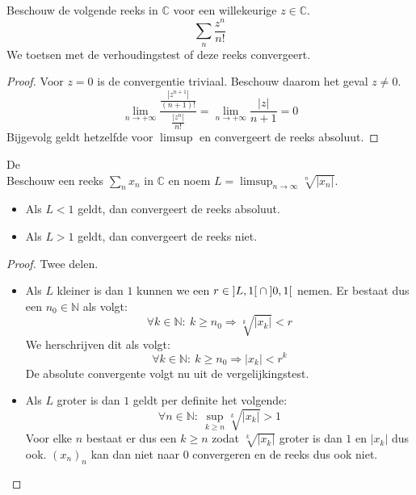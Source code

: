 \documentclass[main.tex]{subfiles}
\begin{document}
\begin{vb}
  Beschouw de volgende reeks in $\mathbb{C}$ voor een willekeurige $z\in \mathbb{C}$.
  \[ \sum_{n}\frac{z^{n}}{n!} \]
  We toetsen met de verhoudingstest of deze reeks convergeert.

  \begin{proof}
    Voor $z=0$ is de convergentie triviaal.
    Beschouw daarom het geval $z \neq 0$.
    \[ \lim_{n\rightarrow +\infty}\frac{\frac{|z^{n+1}|}{(n+1)!}}{\frac{|z^{n}|}{n!}} = \lim_{n \rightarrow +\infty }\frac{|z|}{n+1} = 0 \]
    Bijgevolg geldt hetzelfde voor $\limsup$  en convergeert de reeks absoluut.
  \end{proof}
\end{vb}

\begin{st}
  \label{st:worteltest-cauchy}
  De \\
  Beschouw een reeks $\sum_{n}x_{n}$ in $\mathbb{C}$ en noem $L= \limsup_{n\rightarrow \infty}\sqrt[n]{|x_{n}|}$.
  \begin{itemize}
  \item Als $L<1$ geldt, dan convergeert de reeks absoluut.
  \item Als $L>1$ geldt, dan convergeert de reeks niet.
  \end{itemize}

  \begin{proof}
    Twee delen.
    \begin{itemize}
    \item Als $L$ kleiner is dan $1$ kunnen we een $r\in \interval[open]{L}{1} \cap \interval[open]{0}{1}$ nemen.
      Er bestaat dus een $n_{0}\in \mathbb{N}$ als volgt:
      \[ \forall k\in \mathbb{N}:\ k \ge n_{0} \Rightarrow \sqrt[k]{|x_{k}|} < r \]
      We herschrijven dit als volgt:
      \[ \forall k\in \mathbb{N}:\ k \ge n_{0} \Rightarrow |x_{k}| < r^{k} \]
      De absolute convergente volgt nu uit de vergelijkingstest.
    \item Als $L$ groter is dan $1$ geldt per definite het volgende:
      \[ \forall n\in \mathbb{N}:\ \sup_{k\ge n}\sqrt[k]{|x_{k}|} > 1 \]
      Voor elke $n$ bestaat er dus een $k\ge n$ zodat $\sqrt[k]{|x_{k}|}$ groter is dan $1$ en $|x_{k}|$ dus ook.
      $(x_{n})_{n}$ kan dan niet naar $0$ convergeren en de reeks dus ook niet.
    \end{itemize}
  \end{proof}
\end{st}
\end{document}
